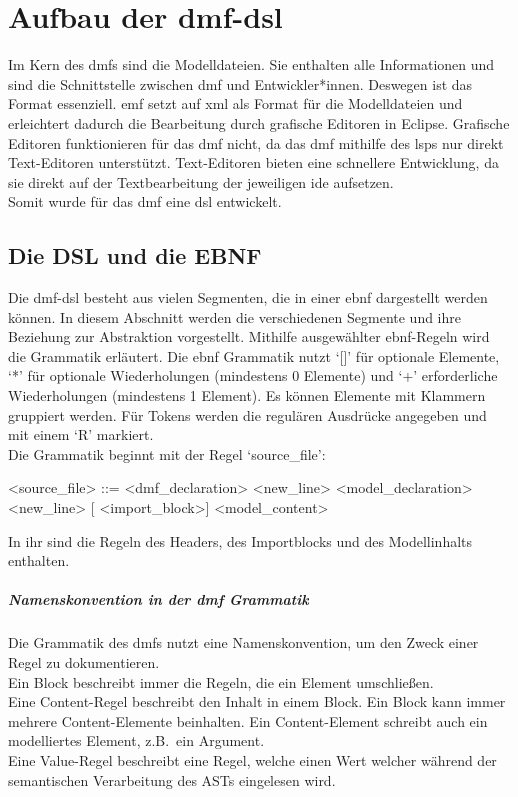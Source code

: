 \documentclass[./einleitung.tex]{subfiles}
\begin{document}
\section{Aufbau der \acrshort{dmf}-\acrshort{dsl}}
Im Kern des \acrshort{dmf}s sind die Modelldateien.
Sie enthalten alle Informationen und sind die Schnittstelle zwischen \acrshort{dmf} und Entwickler*innen.
Deswegen ist das Format essenziell.
\acrshort{emf} setzt auf \acrshort{xml} als Format für die Modelldateien und erleichtert dadurch die Bearbeitung durch grafische Editoren in Eclipse.
Grafische Editoren funktionieren für das \acrshort{dmf} nicht, da das \acrshort{dmf} mithilfe des \acrlong{lsp}s nur direkt Text-Editoren unterstützt.
Text-Editoren bieten eine schnellere Entwicklung, da sie direkt auf der Textbearbeitung der jeweiligen \acrshort{ide} aufsetzen. \\
Somit wurde für das \acrshort{dmf} eine \acrfull{dsl} entwickelt.
\subsection{Die DSL und die EBNF}
Die \acrshort{dmf}-\acrshort{dsl} besteht aus vielen Segmenten, die in einer \acrfull{ebnf} dargestellt werden können.
In diesem Abschnitt werden die verschiedenen Segmente und ihre Beziehung zur Abstraktion vorgestellt.
Mithilfe ausgewählter \acrshort{ebnf}-Regeln wird die Grammatik erläutert.\newline \newline
Die \acrshort{ebnf} Grammatik nutzt `[]' für optionale Elemente, `*' für optionale Wiederholungen (mindestens 0 Elemente) und `+' erforderliche Wiederholungen (mindestens 1 Element).
Es können Elemente mit Klammern gruppiert werden.
Für Tokens werden die regulären Ausdrücke angegeben und mit einem `R' markiert.\\

Die Grammatik beginnt mit der Regel `source\_file':
\begin{grammar}
<source\_file> ::= <dmf_declaration> <new_line> <model_declaration> <new_line> [ <import_block>] <model_content>
\end{grammar}
In ihr sind die Regeln des Headers, des Importblocks und des Modellinhalts enthalten.

\subparagraph{Namenskonvention in der \acrshort{dmf} Grammatik}
Die Grammatik des \acrshort{dmf}s nutzt eine Namenskonvention, um den Zweck einer Regel zu dokumentieren.\\
Ein Block beschreibt immer die Regeln, die ein Element umschließen. \\
Eine Content-Regel beschreibt den Inhalt in einem Block.
Ein Block kann immer mehrere Content-Elemente beinhalten.
Ein Content-Element schreibt auch ein modelliertes Element, z.B.\ ein Argument. \\
Eine Value-Regel beschreibt eine Regel, welche einen Wert welcher während der semantischen Verarbeitung des ASTs eingelesen wird.
\end{document}
